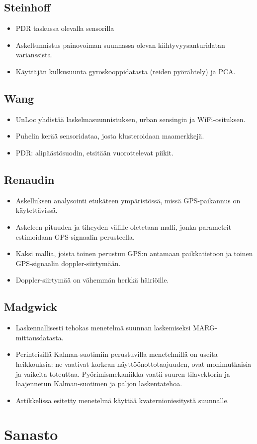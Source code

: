 \documentclass[a4paper]{scrartcl}
\begin{document}
\subsection{Steinhoff\cite{steinhoff2010dead}}
\begin{itemize}
  \item PDR taskussa olevalla sensorilla
  \item Askeltunnistus painovoiman suunnassa olevan kiihtyvyysanturidatan
    varianssista.
  \item Käyttäjän kulkusuunta gyroskooppidatasta (reiden pyörähtely) ja
    PCA.
\end{itemize}

\subsection{Wang\cite{wang2012unsupervised}}
\begin{itemize}
  \item UnLoc yhdistää laskelmasuunnistuksen, urban sensingin ja WiFi-osituksen.
  \item Puhelin kerää sensoridataa, josta klusteroidaan maamerkkejä.
  \item PDR: alipäästösuodin, etsitään vuorottelevat piikit.
\end{itemize}

\subsection{Renaudin\cite{renaudin2013adaptative}}
\begin{itemize}
  \item Askelluksen analysointi etukäteen ympäristössä, missä GPS-paikannus
    on käytettävissä.
  \item Askeleen pituuden ja tiheyden välille oletetaan malli, jonka parametrit
    estimoidaan GPS-signaalin perusteella.
  \item Kaksi mallia, joista toinen perustuu GPS:n antamaan paikkatietoon ja
    toinen GPS-signaalin doppler-siirtymään.
  \item Doppler-siirtymää on vähemmän herkkä häiriöille.
\end{itemize}

\subsection{Madgwick\cite{madgwick2011estimation}}
\begin{itemize}
  \item Laskennallisesti tehokas menetelmä suunnan laskemiseksi MARG-
    mittausdatasta.
  \item Perinteisillä Kalman-suotimiin perustuvilla menetelmillä on
    useita heikkouksia: ne vaativat korkean näyttöönottotaajuuden, ovat
    monimutkaisia ja vaikeita toteuttaa. Pyörimismekaniikka vaatii
    suuren tilavektorin ja laajennetun Kalman-suotimen ja paljon
    laskentatehoa.
  \item Artikkelissa esitetty menetelmä käyttää kvaternioniesitystä suunnalle.
\end{itemize}
\cite{mautz2012indoor}
\cite{faragher2012opportunistic}

\section{Sanasto}

\glsaddall
\printglossary
\glsaddall
\printglossary[type=\acronymtype,title=Lyhenteet]



\end{document}
